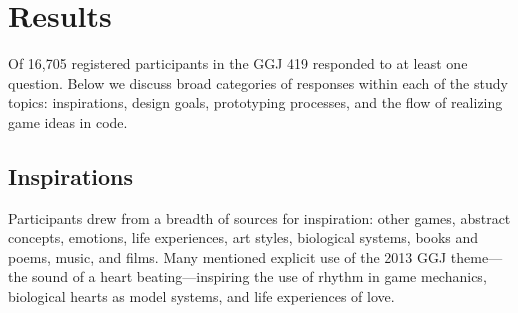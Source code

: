 \documentclass{sig-alternate}
\begin{document}
\section{Results}
Of 16,705 registered participants in the GGJ 419 responded to at least one question.
Below we discuss broad categories of responses within each of the study topics: inspirations, design goals, prototyping processes, and the flow of realizing game ideas in code.



\subsection{Inspirations}
Participants drew from a breadth of sources for inspiration: other games, abstract concepts, emotions, life experiences, art styles, biological systems, books and poems, music, and films. Many mentioned explicit use of the 2013 GGJ theme---the sound of a heart beating---inspiring the use of rhythm in game mechanics, biological hearts as model systems, and life experiences of love.

\end{document}
